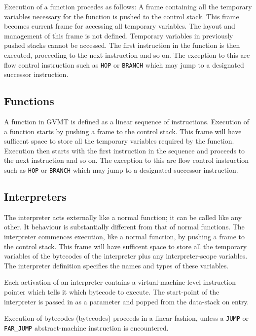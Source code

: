 Execution of a function procedes as follows:
A frame containing all the temporary variables necessary for the function is pushed to the control stack. This frame becomes current frame for accessing all temporary variables. The layout and management of this frame is not defined. Temporary variables in previously pushed stacks cannot be accessed.
The first instruction in the function is then executed, proceeding to the next instruction and so on. The exception to this are flow control instruction such as \verb|HOP| or \verb|BRANCH| which may jump to a designated successor instruction. 

\subsection{Functions}

A function in GVMT is defined as a linear sequence of instructions. Execution of a function starts by pushing a frame to the control stack. This frame will have  sufficent space to store all the temporary variables required by the function. 
Execution then starts with the first instruction in the sequence and proceeds to the next instruction and so on. The exception to this are flow control instruction such as \verb|HOP| or \verb|BRANCH| which may jump to a designated successor instruction.

\subsection{Interpreters}

The interpreter acts externally like a normal function; it can be called like any other. It behaviour is substantially different from that of normal functions.
The interpreter commences execution, like a normal function, by pushing a frame to the control stack. This frame will have  sufficent space to store all the temporary variables of the bytecodes of the interpreter plus any interpreter-scope variables. The interpreter definition specifies the names and types of these variables.

Each activation of an interpreter contains a virtual-machine-level instruction pointer which tells it which bytecode to execute.
The start-point of the  interpreter is passed in as a parameter and popped from the data-stack on entry.

Execution of bytecodes (bytecodes) proceeds in a linear fashion, unless a \verb|JUMP| or \verb|FAR_JUMP| abstract-machine instruction is encountered.

